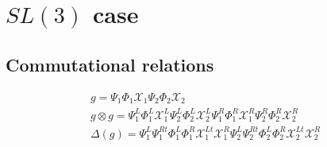 \documentclass{paper}
\def\be{\begin{eqnarray}}
\def\ee{\end{eqnarray}}
\def\dg{\Delta \lb g \rb}
\def\lb{\left (}
\def\rb{\right )}
\def\gog{g \otimes g}
\def\Chi{\mathcal{X}}
\newcommand{\EChiLi}[1]{\Chi_#1^L}
\newcommand{\EChiRi}[1]{\Chi_#1^R}
\newcommand{\EChiLTi}[1]{\Chi_#1^{Lt}}
\newcommand{\EPsiLi}[1]{\Psi_#1^L}
\newcommand{\EPsiRi}[1]{\Psi_#1^R}
\newcommand{\EPsiRTi}[1]{\Psi_#1^{Rt}}
\newcommand{\QPhiLi}[1]{\Phi_#1^L}
\newcommand{\QPhiRi}[1]{\Phi_#1^R}
\newcommand{\EBlockLi}[1]{\EPsiLi{#1} \QPhiLi{#1} \EChiLi{#1}}
\newcommand{\EBlockRi}[1]{\EPsiRi{#1} \QPhiRi{#1} \EChiRi{#1}}
\newcommand{\ComultBlock}[1]{\EPsiLi{#1}\EPsiRTi{#1}\QPhiLi{#1}\QPhiRi{#1}\EChiLTi{#1}\EChiRi{#1}}
\newcommand{\Htwo}[1]{\lb \begin{array}{ccc}
#1^{1/3} & 0 & 0 \\ 0 & #1^{1/3} & 0 \\ 0 & 0 & #1^{-2/3}
\end{array} \rb}
\newcommand{\Etwo}[1]{\lb \begin{array}{ccc}
1 & 0 & 0 \\ 0 & 1 & #1 \\ 0 & 0 & 1
\end{array} \rb}
\newcommand{\Ftwo}[1]{\lb \begin{array}{ccc}
1 & 0 & 0 \\ 0 & 1 & 0 \\ 0 & #1 & 1
\end{array} \rb}
\begin{document}






\section{$SL(3)$ case}

\subsection{Commutational relations}
\be
g  = \Psi_1 \Phi_1 \Chi_1 \Psi_2 \Phi_2 \Chi_2 \\
\gog  = \EBlockLi{1}\EBlockLi{2}\EBlockRi{1}\EBlockRi{2} \\
\dg  = \ComultBlock{1}\ComultBlock{2}
\ee
\end{document}
